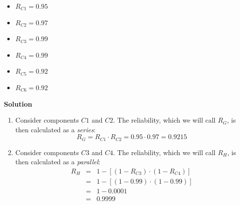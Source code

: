 \begin{examplebox}
\begin{center}
    \end{center}
    \begin{multicols}{3}
        \begin{itemize}
            \item $R_{C1} = 0.95$
            \item $R_{C2} = 0.97$
            \item $R_{C3} = 0.99$
            \item $R_{C4} = 0.99$
            \item $R_{C5} = 0.92$
            \item $R_{C6} = 0.92$
        \end{itemize}
    \end{multicols}
    \begin{flushleft}
        \textcolor{Green3}{ \textbf{Solution}}
    \end{flushleft}
    \begin{enumerate}
        \item Consider components $C1$ and $C2$. The reliability, which we will call $R_{G}$, is then calculated as a \emph{series}:
        \begin{equation*}
            R_{G} = R_{C1} \cdot R_{C2} = 0.95 \cdot 0.97 = 0.9215
        \end{equation*}

        \item Consider components $C3$ and $C4$. The reliability, which we will call $R_{H}$, is then calculated as a \emph{parallel}:
        \begin{equation*}
            \begin{array}{rcl}
                R_{H} &=& 1 - \left[\left(1-R_{C3}\right) \cdot \left(1-R_{C4}\right)\right] \\ [.5em]
                &=& 1 - \left[\left(1 - 0.99\right) \cdot \left(1 - 0.99\right)\right] \\ [.5em]
                &=& 1 - 0.0001 \\ [.5em]
                &=& 0.9999
            \end{array}
        \end{equation*}


\end{enumerate}
\end{examplebox}

